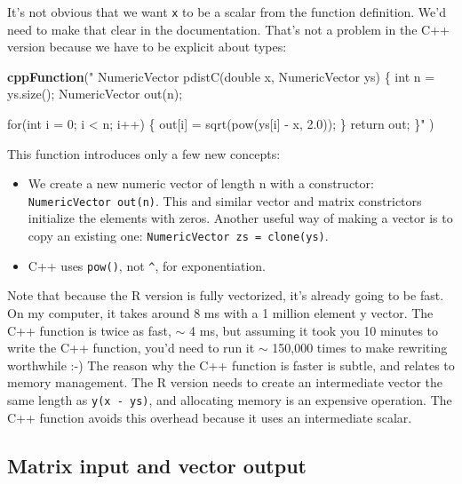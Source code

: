 \documentclass[
]{krantz}
\makeatletter
\newenvironment{Shaded}{\begin{snugshade}}{\end{snugshade}}
\newcommand{\KeywordTok}[1]{\textcolor[rgb]{0.27,0.27,0.27}{\textbf{#1}}}
\newcommand{\NormalTok}[1]{#1}
\newcommand{\StringTok}[1]{\textcolor[rgb]{0.5,0.5,0.5}{#1}}
\providecommand{\tightlist}{%
  \setlength{\itemsep}{0pt}\setlength{\parskip}{0pt}}
\newenvironment{kframe}{%
\medskip{}
\setlength{\fboxsep}{.8em}
 \def\at@end@of@kframe{}%
 \ifinner\ifhmode%
  \def\at@end@of@kframe{\end{minipage}}%
  \begin{minipage}{\columnwidth}%
 \fi\fi%
 \def\FrameCommand##1{\hskip\@totalleftmargin \hskip-\fboxsep
 \colorbox{shadecolor}{##1}\hskip-\fboxsep
     \hskip-\linewidth \hskip-\@totalleftmargin \hskip\columnwidth}%
 \MakeFramed {\advance\hsize-\width
   \@totalleftmargin\z@ \linewidth\hsize
   \@setminipage}}%
 {\par\unskip\endMakeFramed%
 \at@end@of@kframe}
\renewenvironment{Shaded}{\begin{kframe}}{\end{kframe}}
\makeatother
\begin{document}
It's not obvious that we want \texttt{x} to be a scalar from the function definition. We'd need to make that clear in the documentation. That's not a problem in the C++ version because we have to be explicit about types:

\begin{Shaded}
\begin{Highlighting}[]
\KeywordTok{cppFunction}\NormalTok{(}\StringTok{"}
\StringTok{  NumericVector pdistC(double x, NumericVector ys) \{}
\StringTok{    int n = ys.size();}
\StringTok{    NumericVector out(n);}

\StringTok{    for(int i = 0; i \textless{} n; i++) \{}
\StringTok{      out[i] = sqrt(pow(ys[i] {-} x, 2.0));}
\StringTok{    \}}
\StringTok{    return out;}
\StringTok{  \}"}
\NormalTok{)}
\end{Highlighting}
\end{Shaded}

This function introduces only a few new concepts:

\begin{itemize}
\tightlist
\item
  We create a new numeric vector of length n with a constructor: \texttt{NumericVector\ out(n)}. This and similar vector and matrix constrictors initialize the elements with zeros. Another useful way of making a vector is to copy an existing one: \texttt{NumericVector\ zs\ =\ clone(ys)}.
\item
  C++ uses \texttt{pow()}, not \texttt{\^{}}, for exponentiation.
\end{itemize}

Note that because the R version is fully vectorized, it's already going to be fast. On my computer, it takes around 8 ms with a 1 million element y vector. The C++ function is twice as fast, \(\sim\) 4 ms, but assuming it took you 10 minutes to write the C++ function, you'd need to run it \(\sim\) 150,000 times to make rewriting worthwhile :-) The reason why the C++ function is faster is subtle, and relates to memory management. The R version needs to create an intermediate vector the same length as \texttt{y(x\ -\ ys)}, and allocating memory is an expensive operation. The C++ function avoids this overhead because it uses an intermediate scalar.

\hypertarget{matrix-input-and-vector-output}{%
\subsection{Matrix input and vector output}\label{matrix-input-and-vector-output}}
\end{document}
